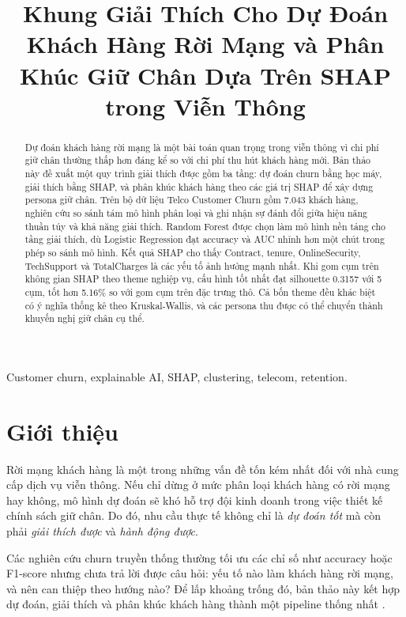 ﻿\documentclass[conference]{IEEEtran}
\title{Khung Giải Thích Cho Dự Đoán Khách Hàng Rời Mạng và Phân Khúc Giữ Chân Dựa Trên SHAP trong Viễn Thông}
\author{
\IEEEauthorblockN{Vũ Trung Kiên}
\IEEEauthorblockA{Khoa Khoa học Dữ liệu\\Đại học Công nghệ Thông tin\\Thành phố Hồ Chí Minh, Việt Nam\\Email: student@uit.edu.vn}
}
\begin{document}
\maketitle

\begin{abstract}
Dự đoán khách hàng rời mạng là một bài toán quan trọng trong viễn thông vì chi phí giữ chân thường thấp hơn đáng kể so với chi phí thu hút khách hàng mới. Bản thảo này đề xuất một quy trình giải thích được gồm ba tầng: dự đoán churn bằng học máy, giải thích bằng SHAP, và phân khúc khách hàng theo các giá trị SHAP để xây dựng persona giữ chân. Trên bộ dữ liệu Telco Customer Churn gồm 7.043 khách hàng, nghiên cứu so sánh tám mô hình phân loại và ghi nhận sự đánh đổi giữa hiệu năng thuần túy và khả năng giải thích. Random Forest được chọn làm mô hình nền tảng cho tầng giải thích, dù Logistic Regression đạt accuracy và AUC nhỉnh hơn một chút trong phép so sánh mô hình. Kết quả SHAP cho thấy Contract, tenure, OnlineSecurity, TechSupport và TotalCharges là các yếu tố ảnh hưởng mạnh nhất. Khi gom cụm trên không gian SHAP theo theme nghiệp vụ, cấu hình tốt nhất đạt silhouette 0.3157 với 5 cụm, tốt hơn 5.16\% so với gom cụm trên đặc trưng thô. Cả bốn theme đều khác biệt có ý nghĩa thống kê theo Kruskal-Wallis, và các persona thu được có thể chuyển thành khuyến nghị giữ chân cụ thể.
\end{abstract}

\begin{IEEEkeywords}
Customer churn, explainable AI, SHAP, clustering, telecom, retention.
\end{IEEEkeywords}

\section{Giới thiệu}
Rời mạng khách hàng là một trong những vấn đề tốn kém nhất đối với nhà cung cấp dịch vụ viễn thông. Nếu chỉ dừng ở mức phân loại khách hàng có rời mạng hay không, mô hình dự đoán sẽ khó hỗ trợ đội kinh doanh trong việc thiết kế chính sách giữ chân. Do đó, nhu cầu thực tế không chỉ là \emph{dự đoán tốt} mà còn phải \emph{giải thích được} và \emph{hành động được}.

Các nghiên cứu churn truyền thống thường tối ưu các chỉ số như accuracy hoặc F1-score nhưng chưa trả lời được câu hỏi: yếu tố nào làm khách hàng rời mạng, và nên can thiệp theo hướng nào? Để lấp khoảng trống đó, bản thảo này kết hợp dự đoán, giải thích và phân khúc khách hàng thành một pipeline thống nhất \cite{alam2020customer, lundberg2017unified, breiman2001random}.
\end{document}

